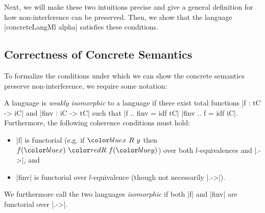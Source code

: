 Next, we will make these two intuitions precise and give a general
definition for how non-interference can be preserved.  Then, we
show that the language |concreteLangMl alpha| satisfies these
conditions.



\subsection{Correctness of Concrete Semantics}

To formalize the conditions under which we can show the concrete
semantics preserve non-interference, we require some notation:

\begin{definition}
  A language  is \textit{weakly isomorphic} to a
  language  if there exist total functions
  |f : tC -> iC| and |finv : iC -> tC| such that |f .. finv = idf tC|
  |finv .. f = idf iC|.  Furthermore, the following coherence conditions
  must hold:
  \begin{itemize}
    \item |f| is functorial (e.g. if $\abs{x\ R\ y}$ then
    $f(\abs{x})\ \con{R}\ f(\abs{y})$) over both
    $l$-equivalences and |.->|, and
    \item |finv| is functorial over $l$-equivalence (though not necessarily |.->|).
  \end{itemize}
  We furthermore call the two languages \textit{isomorphic} if both
  |f| and |finv| are functorial over |.->|.
\end{definition}

